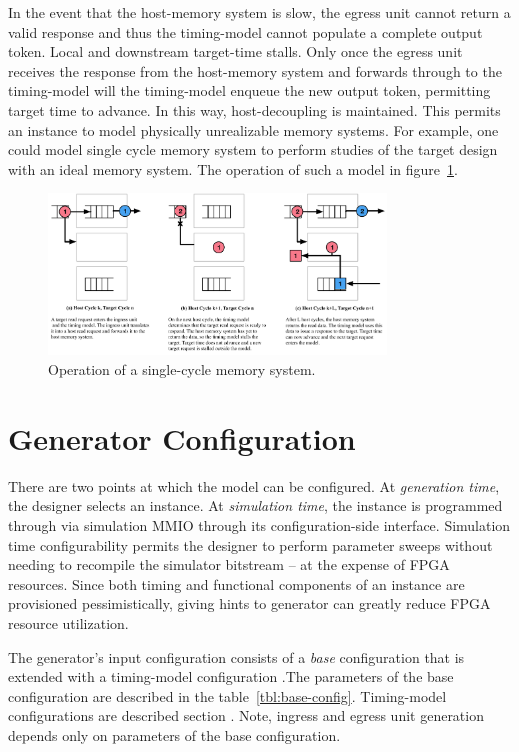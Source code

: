 In the event that the host-memory system is slow, the egress unit cannot return
a valid response and thus the timing-model cannot populate a complete output
token. Local and downstream target-time stalls. Only once the egress unit
receives the response from the host-memory system and forwards through to the
timing-model will the timing-model enqueue the new output token, permitting
target time to advance.  In this way, host-decoupling is maintained. This
permits an instance to model physically unrealizable memory systems. For
example, one could model single cycle memory system to perform studies of the
target design with an ideal memory system. The operation of such a model in
figure~\ref{fig:model_operation}.

\begin{figure} \centering
\includegraphics[width=0.8\textwidth]{figures/memory-model-operation.pdf}
\caption{Operation of a single-cycle memory system.}
\label{fig:model_operation} \end{figure}

\section{Generator Configuration}\label{sec:generator-parameters}

There are two points at which the model can be configured.  At
\textit{generation time}, the designer selects an instance. At
\textit{simulation time}, the instance is programmed through via simulation
MMIO through its configuration-side interface. Simulation time configurability
permits the designer to perform parameter sweeps without needing to recompile
the simulator bitstream -- at the expense of FPGA resources. Since both timing
and functional components of an instance are provisioned pessimistically,
giving hints to generator can greatly reduce FPGA resource utilization.

The generator's input configuration consists of a \emph{base} configuration
that is extended with a timing-model configuration .The parameters of the base
configuration are described in the table~\ref{tbl:base-config}. Timing-model
configurations are described section \label{sec:timing-model}.  Note, ingress
and egress unit generation depends only on parameters of the base
configuration.

